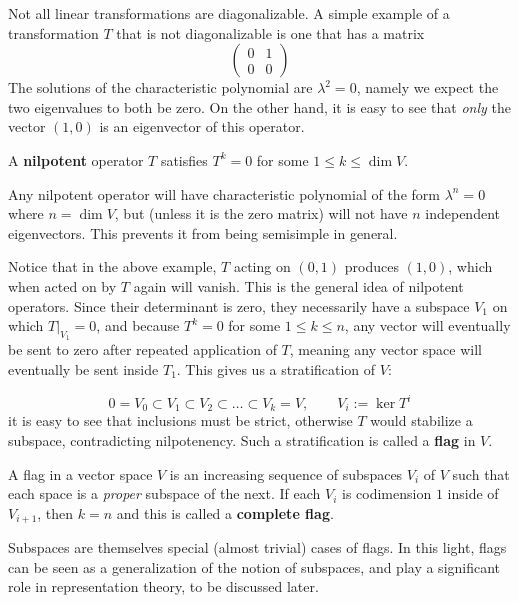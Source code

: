 		Not all linear transformations are diagonalizable. A simple example of a transformation $T$ that is not diagonalizable is one that has a matrix
		$$\begin{pmatrix}
			0 & 1\\
			0 & 0
		\end{pmatrix}$$ 
		The solutions of the characteristic polynomial are $\lambda^2 = 0$, namely we expect the two eigenvalues to both be zero. On the other hand, it is easy to see that \emph{only} the vector $(1, 0)$ is an eigenvector of this operator. 
		\begin{defn}
			A \textbf{nilpotent} operator $T$ satisfies $T^k = 0$ for some $1 \leq k \leq \dim V$.
		\end{defn}
		Any nilpotent operator will have characteristic polynomial of the form $\lambda^n = 0$ where $n = \dim V$, but (unless it is the zero matrix) will not have $n$ independent eigenvectors. This prevents it from being semisimple in general.
		
		Notice that in the above example, $T$ acting on $(0, 1)$ produces $(1, 0)$, which when acted on by $T$ again will vanish. This is the general idea of nilpotent operators. Since their determinant is zero, they necessarily have a subspace $V_1$ on which $T|_{V_1} = 0$, and because $T^k = 0$ for some $1 \leq k \leq n$, any vector will eventually be sent to zero after repeated application of $T$, meaning any vector space will eventually be sent inside $T_{1}$. This gives us a stratification of $V$:
		
		\begin{equation}
			0  = V_0 \subset V_1 \subset V_2 \subset \dots \subset V_k = V, \qquad V_i := \ker T^i
		\end{equation}
		it is easy to see that inclusions must be strict, otherwise $T$ would stabilize a subspace, contradicting nilpotenency. Such a stratification is called a \textbf{flag} in $V$. 
		\begin{defn}[Flag]
			A flag in a vector space $V$ is an increasing sequence of subspaces $V_i$ of $V$ such that each space is a \emph{proper} subspace of the next. If each $V_i$ is codimension $1$ inside of $V_{i+1}$, then $k = n$ and this is called a \textbf{complete flag}.
		\end{defn}
		Subspaces are themselves special (almost trivial) cases of flags. In this light, flags can be seen as a generalization of the notion of subspaces, and play a significant role in representation theory, to be discussed later.
		
